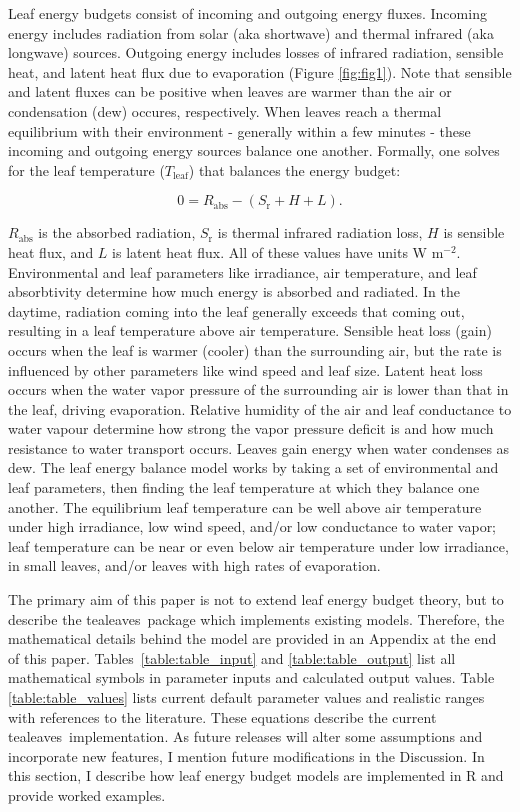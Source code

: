 \documentclass[11pt, oneside]{article}
\newcommand{\pkg}[1]{{\fontseries{b}\selectfont #1}}
\newcommand{\tealeaves}{\pkg{tealeaves}}
\newcommand{\tleaf}{$T_\mathrm{leaf}$}
\begin{document}
Leaf energy budgets consist of incoming and outgoing energy fluxes. Incoming energy includes radiation from solar (aka shortwave) and thermal infrared (aka longwave) sources. Outgoing energy includes losses of infrared radiation, sensible heat, and latent heat flux due to evaporation (Figure \ref{fig:fig1}). Note that sensible and latent fluxes can be positive when leaves are warmer than the air or condensation (dew) occures, respectively. When leaves reach a thermal equilibrium with their environment - generally within a few minutes - these incoming and outgoing energy sources balance one another. Formally, one solves for the leaf temperature (\tleaf) that balances the energy budget:

\begin{equation}
  \label{eq:energy_budget}
  0 = R_\mathrm{abs} - (S_\mathrm{r} + H + L).
\end{equation}

$R_\mathrm{abs}$ is the absorbed radiation, $S_\mathrm{r}$ is thermal infrared radiation loss, $H$ is sensible heat flux, and $L$ is latent heat flux. All of these values have units W m$^{-2}$. Environmental and leaf parameters like irradiance, air temperature, and leaf absorbtivity determine how much energy is absorbed and radiated. In the daytime, radiation coming into the leaf generally exceeds that coming out, resulting in a leaf temperature above air temperature. Sensible heat loss (gain) occurs when the leaf is warmer (cooler) than the surrounding air, but the rate is influenced by other parameters like wind speed and leaf size. Latent heat loss occurs when the water vapor pressure of the surrounding air is lower than that in the leaf, driving evaporation. Relative humidity of the air and leaf conductance to water vapour determine how strong the vapor pressure deficit is and how much resistance to water transport occurs. Leaves gain energy when water condenses as dew. The leaf energy balance model works by taking a set of environmental and leaf parameters, then finding the leaf temperature at which they balance one another. The equilibrium leaf temperature can be well above air temperature under high irradiance, low wind speed, and/or low conductance to water vapor; leaf temperature can be near or even below air temperature under low irradiance, in small leaves, and/or leaves with high rates of evaporation.

The primary aim of this paper is not to extend leaf energy budget theory, but to describe the \tealeaves~package which implements existing models. Therefore, the mathematical details behind the model are provided in an Appendix at the end of this paper. Tables~\ref{table:table_input} and \ref{table:table_output} list all mathematical symbols in parameter inputs and calculated output values. Table \ref{table:table_values} lists current default parameter values and realistic ranges with references to the literature. These equations describe the current \tealeaves~implementation. As future releases will alter some assumptions and incorporate new features, I mention future modifications in the Discussion. In this section, I describe how leaf energy budget models are implemented in R and provide worked examples.
\end{document}
